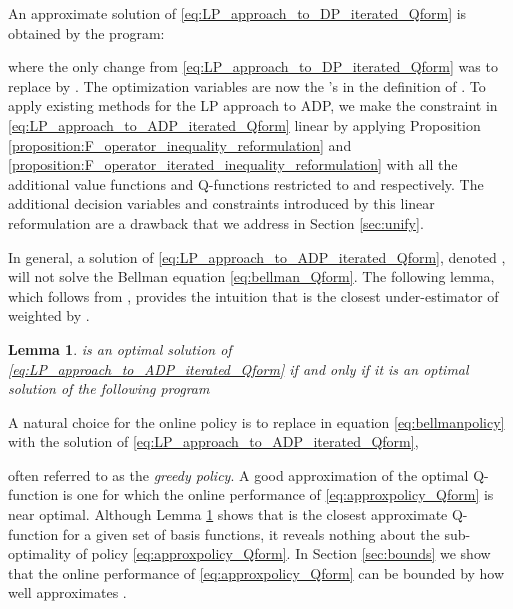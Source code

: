 \documentclass[journal]{IEEEtran}
\newtheorem{lemma}[theorem]{Lemma}
\newcommand{\textQ}{Q}
\begin{document}
An approximate solution of  \eqref{eq:LP_approach_to_DP_iterated_Qform} is obtained by the program:
	
where the only change from \eqref{eq:LP_approach_to_DP_iterated_Qform} was to replace  by . The optimization variables are now the 's in the definition of .
To apply existing methods for the LP approach to ADP, we make the constraint in \eqref{eq:LP_approach_to_ADP_iterated_Qform} linear by applying  Proposition \ref{proposition:F_operator_inequality_reformulation} and \ref{proposition:F_operator_iterated_inequality_reformulation} with all the additional value functions and \textQ-functions restricted to  and  respectively.
The additional decision variables and constraints introduced by this linear reformulation are a drawback that we address in Section \ref{sec:unify}.




In general, a solution of \eqref{eq:LP_approach_to_ADP_iterated_Qform}, denoted , will not solve the Bellman equation \eqref{eq:bellman_Qform}.
The following lemma, which follows from \cite[Lemma 1]{vanRoy_linApproxDP}, provides the intuition that  is the closest under-estimator of  weighted by .

\vspace{0.1cm}

\begin{lemma} \label{lemma:approxLP_for_Q_solves_min_1norm}
	 is an optimal solution of \eqref{eq:LP_approach_to_ADP_iterated_Qform} if and only if it is an optimal solution of the following program
		
\end{lemma}




A natural choice for the online policy is to replace  in equation \eqref{eq:bellmanpolicy} with the solution of \eqref{eq:LP_approach_to_ADP_iterated_Qform},
	
often referred to as the \emph{greedy policy}.
A good approximation of the optimal \textQ-function is one for which the online performance of \eqref{eq:approxpolicy_Qform} is near optimal. Although Lemma \ref{lemma:approxLP_for_Q_solves_min_1norm} shows that  is the closest approximate \textQ-function for a given set of basis functions, it reveals nothing about the sub-optimality of policy \eqref{eq:approxpolicy_Qform}. In Section \ref{sec:bounds} we show that the online performance of \eqref{eq:approxpolicy_Qform} can be bounded by how well  approximates .
\end{document}
